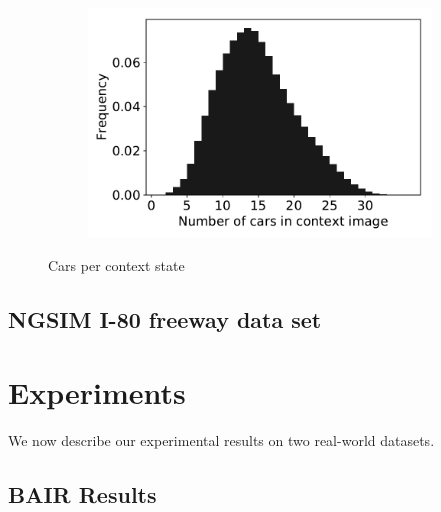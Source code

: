 \documentclass{article}
\begin{document}
\begin{figure}
  \centering
  \begin{subfigure}[b]{0.5\textwidth}
    \includegraphics[width=\textwidth]{images/car_statistics.pdf}
  \end{subfigure}
  \caption{Cars per context state}
  \label{car-statistics}
\end{figure}



\subsection{NGSIM I-80 freeway data set}



\section{Experiments}

We now describe our experimental results on two real-world datasets.

\subsection{BAIR Results}
\end{document}
